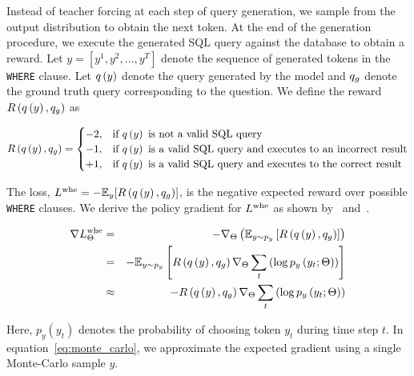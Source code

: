 \documentclass{article} %
\begin{document}
Instead of teacher forcing at each step of query generation, we sample from the output distribution to obtain the next token.
At the end of the generation procedure, we execute the generated SQL query against the database to obtain a reward.
Let $y = [y^1, y^2, ..., y^T]$ denote the sequence of generated tokens in the \texttt{WHERE} clause.
Let $q\left( y \right)$ denote the query generated by the model and $q_g$ denote the ground truth query corresponding to the question.
We define the reward $R \left( q\left( y \right), q_g \right)$ as

\vspace{-2mm}
\begin{equation}
\label{equation:reward}
R \left( q\left( y \right), q_g \right) = 
\begin{cases}
    -2, & \text{if } q\left( y \right) \text{ is not a valid SQL query}\\
    -1, & \text{if } q\left( y \right) \text{ is a valid SQL query and executes to an incorrect result}\\
    +1, & \text{if } q\left( y \right) \text{ is a valid SQL query and executes to the correct result}
\end{cases}
\end{equation}
\vspace{-2mm}

The loss, $L^{\rm whe} = -\mathbb{E}_y [R \left( q\left( y \right), q_g \right)]$, is the negative expected reward over possible \texttt{WHERE} clauses.
We derive the policy gradient for $L^{\rm whe}$ as shown by~\citet{sutton2000policy} and~\citet{Schulman2015GradientEU}.

\vspace{-5mm}
\begin{eqnarray}
\nabla L^{\rm whe}_\Theta &=& - \nabla_\Theta \left( \mathbb{E}_{y \sim p_y} \left[ R \left( q\left( y \right), q_g \right) \right] \right)
\\
&=& - \mathbb{E}_{y \sim p_y} \left[ R \left( q\left( y \right), q_g \right) \nabla_\Theta \sum_t \left( \log p_y \left(y_t ; \Theta \right) \right) \right]
\\
\label{eq:monte_carlo}
&\approx& - R \left( q\left( y \right), q_g \right) \nabla_\Theta \sum_t \left( \log p_y \left(y_t ; \Theta \right) \right)
\end{eqnarray}
\vspace{-4mm}

Here, $p_y(y_t)$ denotes the probability of choosing token $y_t$ during time step $t$.
In equation~\ref{eq:monte_carlo}, we approximate the expected gradient using a single Monte-Carlo sample $y$.
\end{document}
